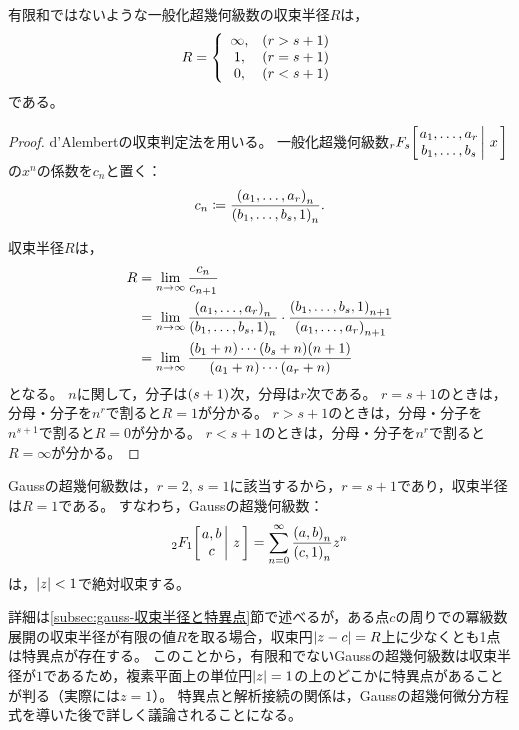 \documentclass[a4paper,draft]{ltjsarticle}
\begin{document}
\begin{prop}[超幾何級数の収束半径]
    有限和ではないような一般化超幾何級数の収束半径$R$は，
    \begin{equation}
        R=\case{
            \begin{array}{cl}        
                \infty, & \pare{r>s+1}
                \\
                1, & \pare{r=s+1}
                \\
                0, & \pare{r<s+1}
            \end{array}
        }
    \end{equation}
    である。
    \begin{proof}
        d'Alembertの収束判定法を用いる。
        一般化超幾何級数$\pfq{r}{s}{a_1,\dots,a_r}{b_1,\dots,b_s}{x}$の$x^n$の係数を$c_n$と置く：
        \begin{equation}
            c_n\coloneqq \dfrac{\poch{a_1,\dots,a_r}{n}}{\poch{b_1,\dots,b_s,1}{n}}.
        \end{equation}

        収束半径$R$は，
        \begin{align}
            R&=\limn\dfrac{c_n}{c_{n+1}}
            \\
            &=\limn\dfrac{\poch{a_1,\dots,a_r}{n}}{\poch{b_1,\dots,b_s,1}{n}}
            \cdot
            \dfrac{\poch{b_1,\dots,b_s,1}{n+1}}{\poch{a_1,\dots,a_r}{n+1}}
            \\
            &=\limn\dfrac{\pare{b_1+n}\cdots\pare{b_s+n}\pare{n+1}}{\pare{a_1+n}\cdots\pare{a_r+n}}
        \end{align}
        となる。
        $n$に関して，分子は$( s+1 )$次，分母は$r$次である。
        $r=s+1$のときは，分母・分子を$n^r$で割ると$R=1$が分かる。
        $r>s+1$のときは，分母・分子を$n^{s+1}$で割ると$R=0$が分かる。
        $r<s+1$のときは，分母・分子を$n^r$で割ると$R=\infty$が分かる。
    \end{proof}
\end{prop}

Gaussの超幾何級数は，$r=2$, $s=1$に該当するから，$r=s+1$であり，収束半径は$R=1$である。
すなわち，Gaussの超幾何級数：
\begin{equation}
    \Gauss{a}{b}{c}{z}=\sum_{n=0}^\infty \dfrac{\poch{a,b}{n}}{\poch{c,1}{n}}z^n
\end{equation}
は，$\abs{z}<1$で絶対収束する。

\begin{rem}
    詳細は\ref{subsec:gauss-収束半径と特異点}節で述べるが，ある点$c$の周りでの冪級数展開の収束半径が有限の値$R$を取る場合，収束円$\abs{z-c}=R$上に少なくとも1点は特異点が存在する。
    このことから，有限和でないGaussの超幾何級数は収束半径が$1$であるため，複素平面上の単位円$\abs{z}=1$の上のどこかに特異点があることが判る（実際には$z=1$）。
    特異点と解析接続の関係は，Gaussの超幾何微分方程式を導いた後で詳しく議論されることになる。
\end{rem}
\end{document}
